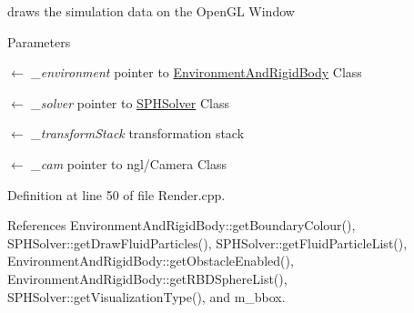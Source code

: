 draws the simulation data on the OpenGL Window 


\begin{DoxyParams}{Parameters}
\item[\mbox{$\leftarrow$} {\em \_\-environment}]pointer to \hyperlink{class_environment_and_rigid_body}{EnvironmentAndRigidBody} Class \item[\mbox{$\leftarrow$} {\em \_\-solver}]pointer to \hyperlink{class_s_p_h_solver}{SPHSolver} Class \item[\mbox{$\leftarrow$} {\em \_\-transformStack}]transformation stack \item[\mbox{$\leftarrow$} {\em \_\-cam}]pointer to ngl/Camera Class \end{DoxyParams}


Definition at line 50 of file Render.cpp.



References EnvironmentAndRigidBody::getBoundaryColour(), SPHSolver::getDrawFluidParticles(), SPHSolver::getFluidParticleList(), EnvironmentAndRigidBody::getObstacleEnabled(), EnvironmentAndRigidBody::getRBDSphereList(), SPHSolver::getVisualizationType(), and m\_\-bbox.




